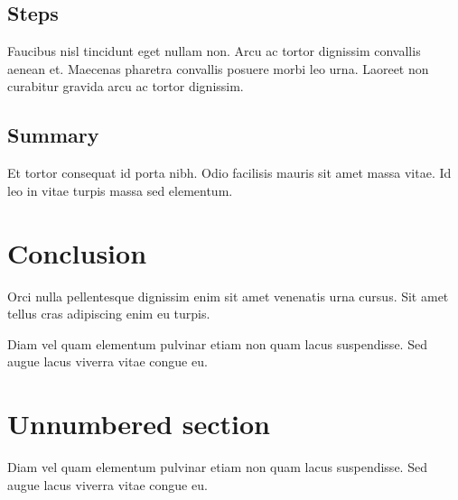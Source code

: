 \documentclass{article}
\begin{document}
\subsection{Steps}

Faucibus nisl tincidunt eget nullam non.
Arcu ac tortor dignissim convallis aenean et.
Maecenas pharetra convallis posuere morbi leo urna.
Laoreet non curabitur gravida arcu ac tortor dignissim.

\subsection{Summary}

Et tortor consequat id porta nibh.
Odio facilisis mauris sit amet massa vitae.
Id leo in vitae turpis massa sed elementum.

\section{Conclusion}

Orci nulla pellentesque dignissim enim sit amet venenatis urna cursus.
Sit amet tellus cras adipiscing enim eu turpis.

Diam vel quam elementum pulvinar etiam non quam lacus suspendisse.
Sed augue lacus viverra vitae congue eu.

\section*{Unnumbered section}

Diam vel quam elementum pulvinar etiam non quam lacus suspendisse.
Sed augue lacus viverra vitae congue eu.
\end{document}
